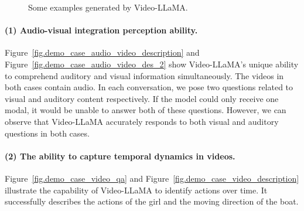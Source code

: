 \documentclass[11pt]{article}
\begin{document}
\begin{figure*}[t]
    \centering
    \vspace{-0.5cm}
        \quad
        
        
    \quad
\caption{Some examples generated by Video-LLaMA. }
    \label{fig.demo_case}
    \vspace{-0.3cm}
\end{figure*}



\paragraph{(1) Audio-visual integration perception ability.} Figure~\ref{fig.demo_case_audio_video_description} and Figure~\ref{fig.demo_case_audio_video_des_2} show Video-LLaMA's unique ability to comprehend auditory and visual information simultaneously. The videos in both cases contain audio. In each conversation, we pose two questions related to visual and auditory content respectively.  If the model could only receive one modal, it would be unable to answer both of these questions. However, we can observe that Video-LLaMA accurately responds to both visual and auditory questions in both cases.

\paragraph{(2) The ability to capture temporal dynamics in videos.} 
Figure~\ref{fig.demo_case_video_qa} and Figure~\ref{fig.demo_case_video_description} illustrate the capability of Video-LLaMA to identify actions over time. 
It successfully describes the actions of the girl and the moving direction of the boat.
\end{document}
